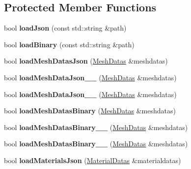 \subsection*{Protected Member Functions}
\begin{DoxyCompactItemize}
\item 
\mbox{\label{classBundle3D_a553e0dc85ddecccc99bc638e77cb612c}} 
bool {\bfseries load\+Json} (const std\+::string \&path)
\item 
\mbox{\label{classBundle3D_ab76b6bea00a0a651ba1df7346cae70ab}} 
bool {\bfseries load\+Binary} (const std\+::string \&path)
\item 
\mbox{\label{classBundle3D_ae12cd1944d7cf874a0d2f71df0991bc8}} 
bool {\bfseries load\+Mesh\+Datas\+Json} (\hyperlink{structMeshDatas}{Mesh\+Datas} \&meshdatas)
\item 
\mbox{\label{classBundle3D_a9d59ef3004556b7c949b1a8f1b72ada8}} 
bool {\bfseries load\+Mesh\+Data\+Json\+\_\+\_} (\hyperlink{structMeshDatas}{Mesh\+Datas} \&meshdatas)
\item 
\mbox{\label{classBundle3D_ad87b9d28a1d45cb977df126a57073bc4}} 
bool {\bfseries load\+Mesh\+Data\+Json\+\_\+\_} (\hyperlink{structMeshDatas}{Mesh\+Datas} \&meshdatas)
\item 
\mbox{\label{classBundle3D_ab9e41b6cd571717d4ffe73fe20eafb7f}} 
bool {\bfseries load\+Mesh\+Datas\+Binary} (\hyperlink{structMeshDatas}{Mesh\+Datas} \&meshdatas)
\item 
\mbox{\label{classBundle3D_accc23e1db385884932671f93b36c294e}} 
bool {\bfseries load\+Mesh\+Datas\+Binary\+\_\+\_} (\hyperlink{structMeshDatas}{Mesh\+Datas} \&meshdatas)
\item 
\mbox{\label{classBundle3D_a0e78626278f6d38a7c9aeca08301b6bd}} 
bool {\bfseries load\+Mesh\+Datas\+Binary\+\_\+\_} (\hyperlink{structMeshDatas}{Mesh\+Datas} \&meshdatas)
\item 
\mbox{\label{classBundle3D_a3c0fcdbe60122bdd2959cbcb3620d5a9}} 
bool {\bfseries load\+Materials\+Json} (\hyperlink{structMaterialDatas}{Material\+Datas} \&materialdatas)

\end{DoxyCompactItemize}
